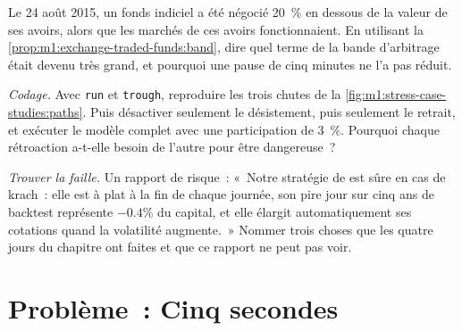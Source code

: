 \begin{exercise}[$\star\star$]\label{exo:m1:stress-case-studies:6}
Le 24 août 2015, un fonds indiciel a été négocié 20~\% en dessous de la valeur de ses
avoirs, alors que les marchés de ces avoirs fonctionnaient. En utilisant la
\cref{prop:m1:exchange-traded-funds:band}, dire quel terme de la bande d'arbitrage
était devenu très grand, et pourquoi une pause de cinq minutes ne l'a pas réduit.
\end{exercise}

\begin{exercise}[$\star\star\star$]\label{exo:m1:stress-case-studies:7}
\emph{Codage.} Avec \texttt{run} et \texttt{trough}, reproduire les trois
chutes de la \cref{fig:m1:stress-case-studies:paths}. Puis désactiver seulement
le désistement, puis seulement le retrait, et exécuter le modèle complet avec
une participation de 3~\%. Pourquoi chaque rétroaction a-t-elle besoin de l'autre pour être dangereuse~?
\end{exercise}

\begin{exercise}[$\star\star\star$]\label{exo:m1:stress-case-studies:8}
\emph{Trouver la faille.} Un rapport de risque~: «~Notre stratégie de  est sûre en cas de krach~: elle est à plat à la fin de chaque journée,
son pire jour sur cinq ans de backtest représente $-0.4\%$ du capital, et elle
élargit automatiquement ses cotations quand la volatilité augmente.~» Nommer trois
choses que les quatre jours du chapitre ont faites et que ce rapport ne peut pas voir.
\end{exercise}

\section{Problème~: Cinq secondes}

